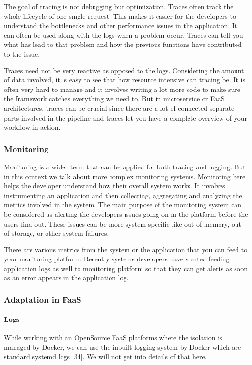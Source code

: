 \documentclass[12pt,titlepage]{article}
\begin{document}
The goal of tracing is not debugging but optimization. Traces often track the
whole lifecycle of one single request. This makes it easier for the developers
to understand the bottlenecks and other performance issues in the application.
It can often be used along with the logs when a problem occur. Traces can tell
you what has lead to that problem and how the previous functions have
contributed to the issue.

Traces need not be very reactive as opposed to the logs. Considering the amount
of data involved, it is easy to see that how resource intensive can tracing be.
It is often very hard to manage and it involves writing a lot more code to make
sure the framework catches everything we need to. But in microservice or FaaS
architectures, traces can be crucial since there are a lot of connected separate
parts involved in the pipeline and traces let you have a complete overview of
your workflow in action.

\subsubsection{Monitoring}
\label{sec:org21b3e1b}
Monitoring is a wider term that can be applied for both tracing and logging. But
in this context we talk about more complex monitoring systems. Monitoring here
helps the developer understand how their overall system works. It involves
instrumenting an application and then collecting, aggregating and analyzing the
metrics involved in the system. The main purpose of the monitoring system can be
considered as alerting the developers issues going on in the platform before the
users find out. These issues can be more system specific like out of memory, out
of storage, or other system failures.

There are various metrics from the system or the application that you can feed
to your monitoring platform. Recently systems developers have started feeding
application logs as well to monitoring platform so that they can get alerts as
soon as an error appears in the application log.

\subsubsection{Adaptation in FaaS}
\label{sec:org8cacbec}

\paragraph{Logs}
\label{sec:org021c6e5}
While working with an OpenSource FaaS platforms where the isolation is managed
by Docker, we can use the inbuilt logging system by Docker which are standard
systemd logs \hyperref[ref:34]{[34}]. We will not get into details of that here.
\end{document}

